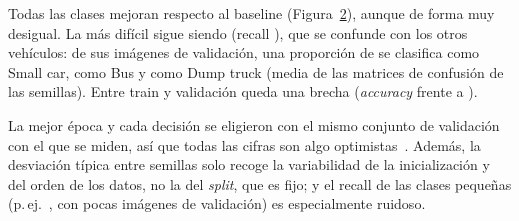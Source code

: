 \begin{figure}[!htbp]
  \centering
  \caption{}
  \label{fig:stopping}
\end{figure}

Todas las clases mejoran respecto al baseline (Figura~\ref{fig:final}), aunque de forma muy desigual. La más difícil
sigue siendo  (recall ), que se confunde con los otros vehículos:
de sus imágenes de validación, una proporción de  se clasifica como Small car,
 como Bus y  como Dump truck (media de las matrices de
confusión de las  semillas). Entre train y validación queda una brecha (\emph{accuracy}  frente a ).

La mejor época y cada decisión se eligieron con el mismo conjunto de validación con el que se miden, así que todas
las cifras son algo optimistas~\cite{cawley}. Además, la desviación típica entre semillas solo recoge la variabilidad
de la inicialización y del orden de los datos, no la del \emph{split}, que es fijo; y el recall de las clases pequeñas
(p.\,ej.\ , con pocas imágenes de validación) es especialmente ruidoso.

\begin{figure}[!htbp]
  \centering
  \caption{}
  \label{fig:final}
\end{figure}